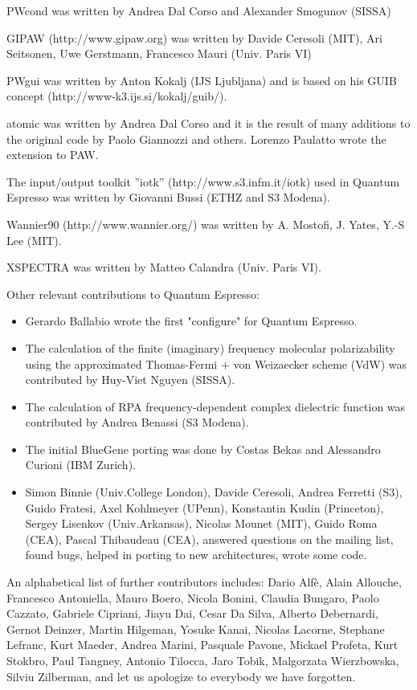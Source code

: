 \documentclass[12pt,a4paper]{article}
\begin{document}
PWcond was written by Andrea Dal Corso and
Alexander Smogunov (SISSA)

GIPAW (http://www.gipaw.org) was written by Davide Ceresoli
(MIT), Ari Seitsonen, Uwe Gerstmann,  Francesco Mauri (Univ.
Paris VI) 

PWgui was written by Anton Kokalj (IJS Ljubljana) and is based on his
GUIB concept (http://www-k3.ijs.si/kokalj/guib/).

atomic was written by Andrea Dal Corso and it is the result 
of many additions to the original code by Paolo Giannozzi 
and others. Lorenzo Paulatto wrote the extension to PAW.

The input/output toolkit ''iotk'' (http://www.s3.infm.it/iotk) used in 
Quantum Espresso was written by Giovanni Bussi (ETHZ and S3 Modena).

Wannier90 (http://www.wannier.org/) was written by A. Mostofi, J. Yates, 
Y.-S Lee (MIT).

XSPECTRA was written by Matteo Calandra (Univ. Paris VI).

Other relevant contributions to Quantum Espresso:
\begin{itemize}
  \item Gerardo Ballabio wrote the first "configure" for Quantum Espresso.
  \item The calculation of the finite (imaginary) frequency molecular
polarizability using the approximated Thomas-Fermi  + von Weizaecker
scheme (VdW) was contributed by Huy-Viet Nguyen (SISSA).
  \item The calculation of RPA frequency-dependent complex dielectric
function was contributed by Andrea Benassi (S3 Modena).
  \item The initial BlueGene porting was done by Costas Bekas and
Alessandro Curioni (IBM Zurich).
  \item Simon Binnie (Univ.College London), Davide Ceresoli,
Andrea Ferretti (S3), Guido Fratesi, Axel Kohlmeyer (UPenn),
Konstantin Kudin (Princeton), Sergey Lisenkov (Univ.Arkansas), 
Nicolas Mounet (MIT), Guido Roma (CEA), Pascal Thibaudeau (CEA), 
answered questions on the mailing list, found bugs, helped in 
porting to new architectures, wrote some code.
\end{itemize}

An alphabetical list of further contributors includes: Dario Alf\`e, 
Alain Allouche, 
Francesco Antoniella, Mauro Boero, Nicola Bonini, Claudia Bungaro, 
Paolo Cazzato, Gabriele Cipriani, Jiayu Dai, Cesar Da Silva, 
Alberto Debernardi, Gernot Deinzer, 
Martin Hilgeman,  Yosuke Kanai, Nicolas Lacorne, Stephane Lefranc,
Kurt Maeder, Andrea Marini, 
Pasquale Pavone,  Mickael Profeta, Kurt Stokbro, Paul Tangney, 
Antonio Tilocca, Jaro Tobik, 
Malgorzata Wierzbowska, Silviu Zilberman, 
and let us apologize to everybody we have forgotten.
    
\end{document}
